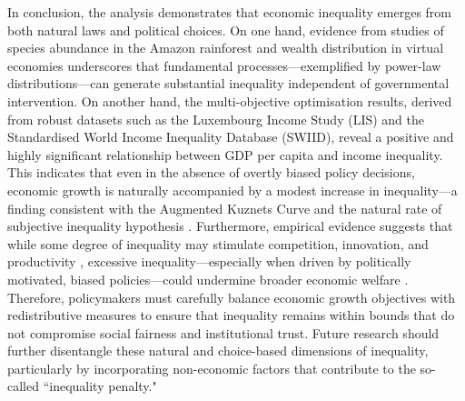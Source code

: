 In conclusion, the analysis demonstrates that economic inequality emerges from both natural laws and political choices. On one hand, evidence from studies of species abundance in the Amazon rainforest \parencite{scheffer2017inequality} and wealth distribution in virtual economies \parencite{fuchs2014behavioral} underscores that fundamental processes—exemplified by power-law distributions—can generate substantial inequality independent of governmental intervention. On another hand, the multi-objective optimisation results, derived from robust datasets such as the Luxembourg Income Study (LIS) and the Standardised World Income Inequality Database (SWIID), reveal a positive and highly significant relationship between GDP per capita and income inequality. This indicates that even in the absence of overtly biased policy decisions, economic growth is naturally accompanied by a modest increase in inequality—a finding consistent with the Augmented Kuznets Curve \parencite{conceicao2001toward} and the natural rate of subjective inequality hypothesis \parencite{lambert2003inequality}. Furthermore, empirical evidence suggests that while some degree of inequality may stimulate competition, innovation, and productivity \parencite{balietti2021incentives}, excessive inequality—especially when driven by politically motivated, biased policies—could undermine broader economic welfare \parencite{galbraith2016inequality}. Therefore, policymakers must carefully balance economic growth objectives with redistributive measures to ensure that inequality remains within bounds that do not compromise social fairness and institutional trust. Future research should further disentangle these natural and choice-based dimensions of inequality, particularly by incorporating non-economic factors that contribute to the so-called ``inequality penalty."

\printbibliography[heading=subbibliography]

\newpage
